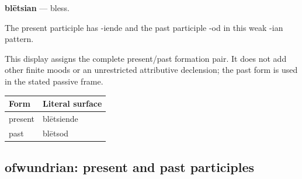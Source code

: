 \par\begin{minipage}{\linewidth}\raggedright
\textbf{blētsian} — bless.

The present participle has -iende and the past participle -od in this weak -ian pattern.

This display assigns the complete present/\allowbreak{}past formation pair. It does not add other finite moods or an unrestricted attributive declension; the past form is used in the stated passive frame.

\par\begingroup
\fontsize{10.5}{13.2}\selectfont
\setlength{\LTleft}{0pt}\setlength{\LTright}{\fill}
\noindent
\begin{tabular}{@{}>{\raggedright\arraybackslash}p{54.47mm}>{\raggedright\arraybackslash}p{66.72mm}@{}}
\toprule
\textbf{Form} & \textbf{Literal surface} \\
\midrule
present & blētsiende \\
past & blētsod \\
\bottomrule
\end{tabular}
\par\endgroup

\end{minipage}\par
{}
\subsection*{ofwundrian: present and past participles}

